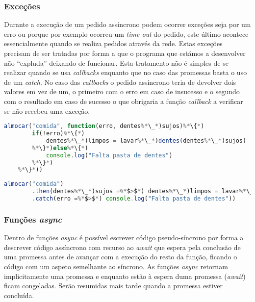 \subsubsection{Exceções}
Durante a execução de um pedido assíncrono podem ocorrer exceções seja por um erro ou porque por exemplo ocorreu um \textit{time out} do pedido, este último acontece essencialmente quando se realiza pedidos através da rede. Estas exceções precisam de ser tratadas por forma a que o programa que estámos a desenvolver não ``expluda'' deixando de funcionar. Esta tratamento não é simples de se realizar quando se usa \textit{callbacks} enquanto que no caso das promessas basta o uso de um \textit{catch}. No caso das \textit{callbacks} o pedido assíncrono teria de devolver dois valores em vez de um, o primeiro com o erro em caso de insucesso e o segundo com o resultado em caso de sucesso o que obrigaria a função \textit{callback} a verificar se não recebeu uma exceção.

\begin{lstlisting}[language=JavaScript, caption=Exemplo de uma \textit{Callback} com captura de exceções]
    almocar("comida", function(erro, dentes%*\_*)sujos)%*\{*)
        if(!erro)%*\{*)
            dentes%*\_*)limpos = lavar%*\_*)dentes(dentes%*\_*)sujos)
        %*\}*)else%*\{*)
            console.log("Falta pasta de dentes")
        %*\}*)
    %*\}*))
\end{lstlisting}

\begin{lstlisting}[language=JavaScript, caption=Exemplo de uma Promessa com captura das exceções]
    almocar("comida")
        .then(dentes%*\_*)sujos =%*$>$*) dentes%*\_*)limpos = lavar%*\_*)dentes(dentes%*\_*)sujos))
        .catch(erro =%*$>$*) console.log("Falta pasta de dentes"))
\end{lstlisting}

\subsubsection{Funções \textit{async}}
Dentro de funções \textit{async} é possível escrever código pseudo-síncrono por forma a descrever código assíncrono com recurso ao \textit{await} que espera pela conclusão de uma promessa antes de avançar com a execução do resto da função, ficando o código com um aspeto semelhante ao síncrono. As funções \textit{async} retornam implicitamente uma promessa e enquanto estão à espera duma promessa (\textit{await}) ficam congeladas. Serão resumidas mais tarde quando a promessa estiver concluída.

